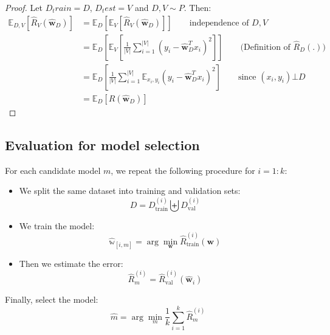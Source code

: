\documentclass[a4paper,10pt,twoside]{article}
\begin{document}
\begin{proof}[Proof]
    Let $D_train=D$, $D_test=V$ and $D,V\sim P$. Then:
    \begin{align*}
        \mathbb{E}_{D,V}[\hat{R}_V(\hat{\mathbf{w}}_D)] &= \mathbb{E}_D[\mathbb{E}_V[\hat{R}_V(\hat{\mathbf{w}}_D)]]\qquad\text{independence of $D,V$}\\
        &=\mathbb{E}_D[\mathbb{E}_V[\frac{1}{|V|}\sum_{i=1}^{|V|}(y_i-\hat{\mathbf{w}}_D^Tx_i)^2]]\qquad\text{(Definition of $\hat{R}_D(.)$)}\\
        &=\mathbb{E}_D[\frac{1}{|V|}\sum_{i=1}^{|V|}\mathbb{E}_{x_i, y_i}(y_i-\hat{\mathbf{w}}_D^Tx_i)^2]\qquad\text{since $(x_i,y_i)\bot D$}\\
        &=\mathbb{E}_D[R(\mathbf{\hat{w}}_D)]
    \end{align*}
\end{proof}
\subsection{Evaluation for model selection}
For each candidate model $m$, we repeat the following procedure for $i=1:k$:
\begin{itemize}
    \item We split the same dataset into training and validation sets:
    \begin{equation*}
        D=D_{\text{train}}^{(i)}\biguplus D_{\text{val}}^{(i)}
    \end{equation*}
    \item We train the model:
    \begin{equation*}
        \hat{\mathbb{w}}_[i,m]=\arg\min_{\mathbf{w}}\hat{R}_{\text{train}}^{(i)}(\mathbf{w})
    \end{equation*}
    \item Then we estimate the error:
    \begin{equation*}
        \hat{R}_{m}^{(i)}=\hat{R}_{\text{val}}^{(i)}(\hat{\mathbf{w}}_i)
    \end{equation*}
\end{itemize}
Finally, select the model:
\begin{equation*}
    \hat{m}=\arg\min_{m}\frac{1}{k}\sum_{i=1}^{k}\hat{R}_{m}^{(i)}
\end{equation*}
\end{document}
